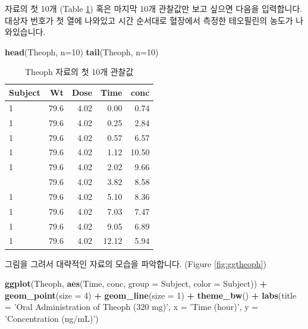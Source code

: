 \documentclass[9pt,]{krantz}
\newenvironment{Shaded}{\begin{snugshade}}{\end{snugshade}}
\newcommand{\DataTypeTok}[1]{\textcolor[rgb]{0.13,0.29,0.53}{#1}}
\newcommand{\DecValTok}[1]{\textcolor[rgb]{0.00,0.00,0.81}{#1}}
\newcommand{\KeywordTok}[1]{\textcolor[rgb]{0.13,0.29,0.53}{\textbf{#1}}}
\newcommand{\NormalTok}[1]{#1}
\newcommand{\OperatorTok}[1]{\textcolor[rgb]{0.81,0.36,0.00}{\textbf{#1}}}
\newcommand{\StringTok}[1]{\textcolor[rgb]{0.31,0.60,0.02}{#1}}
\begin{document}
자료의 첫 10개 (Table \ref{tab:head}) 혹은 마지막 10개 관찰값만 보고 싶으면 다음을 입력합니다.
대상자 번호가 첫 열에 나와있고 시간 순서대로 혈장에서 측정한 테오필린의 농도가 나와있습니다.

\begin{Shaded}
\begin{Highlighting}[]
\KeywordTok{head}\NormalTok{(Theoph, }\DataTypeTok{n=}\DecValTok{10}\NormalTok{)}
\KeywordTok{tail}\NormalTok{(Theoph, }\DataTypeTok{n=}\DecValTok{10}\NormalTok{)}
\end{Highlighting}
\end{Shaded}

\begin{table}[t]

\caption{\label{tab:head}Theoph 자료의 첫 10개 관찰값}
\centering
\begin{tabular}{lrrrr}
\toprule
Subject & Wt & Dose & Time & conc\\
\midrule
1 & 79.6 & 4.02 & 0.00 & 0.74\\
1 & 79.6 & 4.02 & 0.25 & 2.84\\
1 & 79.6 & 4.02 & 0.57 & 6.57\\
1 & 79.6 & 4.02 & 1.12 & 10.50\\
1 & 79.6 & 4.02 & 2.02 & 9.66\\
\addlinespace
1 & 79.6 & 4.02 & 3.82 & 8.58\\
1 & 79.6 & 4.02 & 5.10 & 8.36\\
1 & 79.6 & 4.02 & 7.03 & 7.47\\
1 & 79.6 & 4.02 & 9.05 & 6.89\\
1 & 79.6 & 4.02 & 12.12 & 5.94\\
\bottomrule
\end{tabular}
\end{table}

그림을 그려서 대략적인 자료의 모습을 파악합니다. (Figure \ref{fig:ggtheoph})

\begin{Shaded}
\begin{Highlighting}[]
\KeywordTok{ggplot}\NormalTok{(Theoph, }\KeywordTok{aes}\NormalTok{(Time, conc, }\DataTypeTok{group =}\NormalTok{ Subject, }\DataTypeTok{color =}\NormalTok{ Subject)) }\OperatorTok{+}
\StringTok{  }\KeywordTok{geom_point}\NormalTok{(}\DataTypeTok{size =} \DecValTok{4}\NormalTok{) }\OperatorTok{+}\StringTok{ }
\StringTok{  }\KeywordTok{geom_line}\NormalTok{(}\DataTypeTok{size =} \DecValTok{1}\NormalTok{) }\OperatorTok{+}
\StringTok{  }\KeywordTok{theme_bw}\NormalTok{() }\OperatorTok{+}
\StringTok{  }\KeywordTok{labs}\NormalTok{(}\DataTypeTok{title =} \StringTok{'Oral Administration of Theoph (320 mg)'}\NormalTok{,}
       \DataTypeTok{x =} \StringTok{'Time (hour)'}\NormalTok{, }\DataTypeTok{y =} \StringTok{'Concentration (ng/mL)'}\NormalTok{)}
\end{Highlighting}
\end{Shaded}
\end{document}
